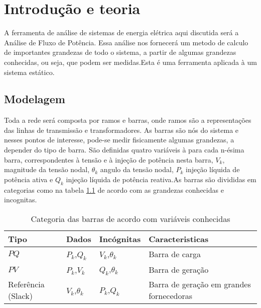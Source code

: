 \chapter{Introdu\c{c}\~ao e teoria}





A ferramenta de an\'alise de sistemas de energia el\'etrica aqui discutida ser\'a a An\'alise de Fluxo de Pot\^encia. Essa an\'alise nos fornecer\'a um metodo de calculo de importantes grandezas de todo o sistema, a partir de algumas grandezas conhecidas, ou seja, que podem ser medidas.Esta \'e uma ferramenta aplicada \`a um sistema est\'atico.
\section{Modelagem}
Toda a rede ser\'a composta por ramos e barras, onde ramos s\~ao a representa\c{c}\~oes das linhas de transmiss\~ao e transformadores. As barras s\~ao n\'os do sistema e nesses pontos de interesse, pode-se medir fisicamente algumas grandezas, a depender do tipo de barra. S\~ao definidas quatro vari\'aveis \`a para cada n-ésima barra, correspondentes \`a tens\~ao e \`a inje\c{c}\~ao de
pot\^encia nesta barra, $V_k$, magnitude da tens\~ao nodal, $\theta_k$ angulo da tens\~ao nodal, $P_k$ inje\c{c}\~ao l\'iquida de pot\^encia ativa e $Q_k$ inje\c{c}\~ao l\'iquida de pot\^encia reativa.As barras s\~ao divididas em categorias como na tabela \ref{t_PQPVSlack} de acordo com as grandezas conhecidas e incognitas.
\begin{table}[]
\caption{Categoria das barras de acordo com variáveis conhecidas}
\begin{tabular}{@{}llll@{}}
\toprule
Tipo & Dados & Incógnitas & Caracteristicas \\ 
\midrule
$PQ$ & $P_k$,$Q_k$ & $V_k$,$\theta_k$  & Barra de carga \\
$PV$ & $P_k$,$V_k$ & $Q_k$,$\theta_k$  & Barra de geração\\
Referência (Slack) & $V_k$,$\theta_k$ & $P_k$,$Q_k$& Barra de geração em grandes fornecedoras \\ \bottomrule
\end{tabular}
\label{t_PQPVSlack}
\end{table}



